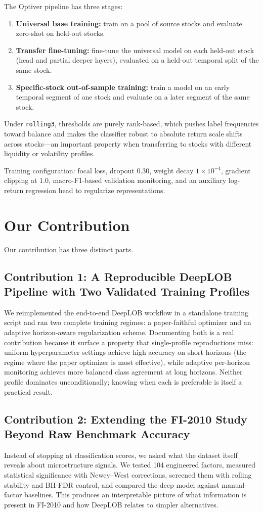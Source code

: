 \documentclass[11pt]{article}
\begin{document}
The Optiver pipeline has three stages:
\begin{enumerate}[leftmargin=*]
    \item \textbf{Universal base training:} train on a pool of source stocks and evaluate zero-shot on held-out stocks.
    \item \textbf{Transfer fine-tuning:} fine-tune the universal model on each held-out stock (head and partial deeper layers), evaluated on a held-out temporal split of the same stock.
    \item \textbf{Specific-stock out-of-sample training:} train a model on an early temporal segment of one stock and evaluate on a later segment of the same stock.
\end{enumerate}

Under \texttt{rolling3}, thresholds are purely rank-based, which pushes label frequencies toward balance and makes the classifier robust to absolute return scale shifts across stocks---an important property when transferring to stocks with different liquidity or volatility profiles.

Training configuration: focal loss, dropout 0.30, weight decay $1\times10^{-4}$, gradient clipping at 1.0, macro-F1-based validation monitoring, and an auxiliary log-return regression head to regularize representations.

\section{Our Contribution}
Our contribution has three distinct parts.

\subsection{Contribution 1: A Reproducible DeepLOB Pipeline with Two Validated Training Profiles}
We reimplemented the end-to-end DeepLOB workflow in a standalone training script and ran two complete training regimes: a paper-faithful optimizer and an adaptive horizon-aware regularization scheme. Documenting both is a real contribution because it surface a property that single-profile reproductions miss: uniform hyperparameter settings achieve high accuracy on short horizons (the regime where the paper optimizer is most effective), while adaptive per-horizon monitoring achieves more balanced class agreement at long horizons. Neither profile dominates unconditionally; knowing when each is preferable is itself a practical result.

\subsection{Contribution 2: Extending the FI-2010 Study Beyond Raw Benchmark Accuracy}
Instead of stopping at classification scores, we asked what the dataset itself reveals about microstructure signals. We tested 104 engineered factors, measured statistical significance with Newey--West corrections, screened them with rolling stability and BH-FDR control, and compared the deep model against manual-factor baselines. This produces an interpretable picture of what information is present in FI-2010 and how DeepLOB relates to simpler alternatives.
\end{document}
